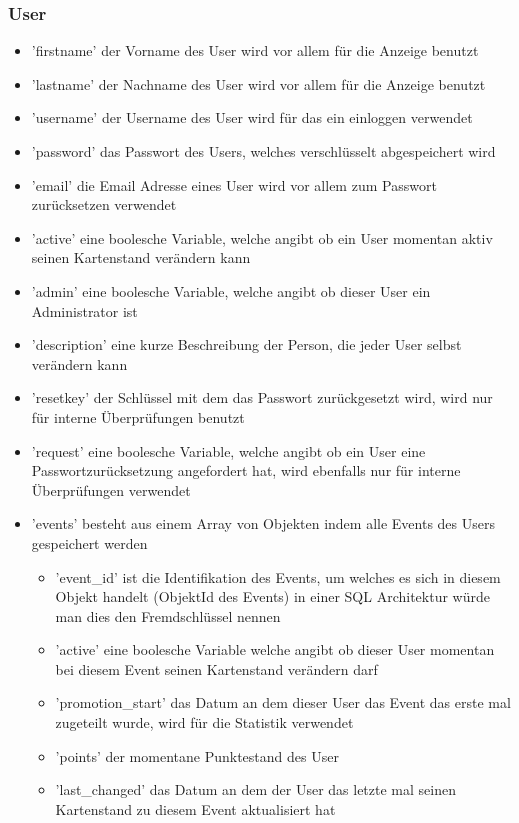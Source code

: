 			\subsubsection{User}
				\begin{itemize}
					\item 'firstname' der Vorname des User wird vor allem für die Anzeige benutzt
					\item 'lastname' der Nachname des User wird vor allem für die Anzeige benutzt
					\item 'username' der Username des User wird für das ein einloggen verwendet
					\item 'password' das Passwort des Users, welches verschlüsselt abgespeichert wird
					\item 'email' die Email Adresse eines User wird vor allem zum Passwort zurücksetzen verwendet
					\item 'active' eine boolesche Variable, welche angibt ob ein User momentan aktiv seinen Kartenstand verändern kann
					\item 'admin' eine boolesche Variable, welche angibt ob dieser User ein Administrator ist
					\item 'description' eine kurze Beschreibung der Person, die jeder User selbst verändern kann
					\item 'resetkey' der Schlüssel mit dem das Passwort zurückgesetzt wird, wird nur für interne Überprüfungen benutzt
					\item 'request' eine boolesche Variable, welche angibt ob ein User eine Passwortzurücksetzung angefordert hat, wird ebenfalls nur für interne Überprüfungen verwendet
					\item 'events' besteht aus einem Array von Objekten indem alle Events des Users gespeichert werden
					\begin{itemize}
						\item 'event\_id' ist die Identifikation des Events, um welches es sich in diesem Objekt handelt (ObjektId des Events) in einer SQL Architektur würde man dies den Fremdschlüssel nennen
						\item 'active' eine boolesche Variable welche angibt ob dieser User momentan bei diesem Event seinen Kartenstand verändern darf
						\item 'promotion\_start' das Datum an dem dieser User das Event das erste mal zugeteilt wurde, wird für die Statistik verwendet
						\item 'points' der momentane Punktestand des User
						\item 'last\_changed' das Datum an dem der User das letzte mal seinen Kartenstand zu diesem Event aktualisiert hat

\end{itemize}
\end{itemize}

